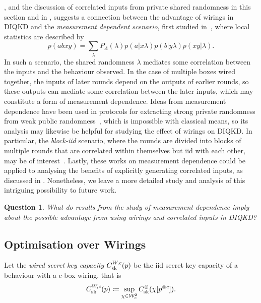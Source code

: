 \documentclass[10pt, a4paper]{article}
\numberwithin{equation}{section} %
\theoremstyle{definition}
\theoremstyle{plain}
\newtheorem{question}{Question}
\newcommand{\?}{\mathrel{?}} %
\newcommand{\sW}{\mathcal{W}}
\newcommand{\sk}{\rm sk}
\begin{document}
    , and the discussion of correlated inputs from private shared randomness in this section and in , suggests a connection between the advantage of wirings in DIQKD and the \emph{measurement dependent scenario}, first studied in~\cite{RelaxedBell}, where local statistics are described by~\cite[Eq. 2]{MDLBeyondIID}
              \begin{equation}
                p(abxy) = \sum_{\lambda} P_{\Lambda}(\lambda) p(a|x\lambda) p(b|y\lambda) p(xy|\lambda).
              \end{equation}
              In such a scenario, the shared randomness \(\lambda\) mediates some correlation between the inputs and the behaviour observed. In the case of multiple boxes wired together, the inputs of later rounds depend on the outputs of earlier rounds, so these outputs can mediate some correlation between the later inputs, which may constitute a form of measurement dependence. Ideas from measurement dependence have been used in protocols for extracting strong private randomness from weak public randomness~\cite{DIRA}, which is impossible with classical means, so its analysis may likewise be helpful for studying the effect of wirings on DIQKD\@. In particular, the  \emph{block-iid} scenario, where the rounds are divided into blocks of multiple rounds that are correlated within themselves but iid with each other, may be of interest~\cite{MDLBeyondIID}. Lastly, these works on measurement dependence could be applied to analysing the benefits of explicitly generating correlated inputs, as discussed in . Nonetheless, we leave a more detailed study and analysis of this intriguing possibility to future work.
              \begin{question}
                What do results from the study of measurement dependence imply about the possible advantage from using wirings and correlated inputs in DIQKD\@?
              \end{question}

              \subsection{Optimisation over Wirings}\label{sec:krwir_wiropt}


              Let the \emph{wired secret key capacity} \(C^{W,c}_{\sk}(p)\) be the iid secret key capacity of a behaviour with a \(c\)-box wiring, that is
                  \begin{equation}
                    C^{W,c}_{\sk}(p) \coloneqq \sup_{\chi\in\sW_c^2} C^{\otimes}_{\sk}(\chi[p^{\otimes c}]).
                  \end{equation}
\end{document}
